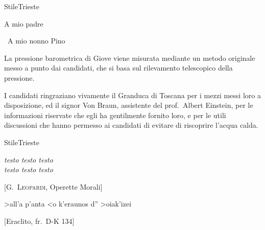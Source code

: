 \documentclass[11pt,twoside,oldstyle,autoretitolo,classica,greek,evenboxes]{toptesi}
\begin{document}

\english%


\expandafter\ifx\csname StileTrieste\endcsname\relax
    \frontespizio
\else
    \paginavuota
    \begin{dedica}
        A mio padre

        \textdagger\ A mio nonno Pino
    \end{dedica}
    \tomo
\fi


\sommario

 La pressione barometrica di Giove viene misurata
mediante un metodo originale  messo a punto dai candidati, che si basa
sul rilevamento telescopico della pressione.

\ringraziamenti

I candidati ringraziano vivamente il Granduca di Toscana per i mezzi
messi loro a disposizione, ed il signor Von Braun, assistente del
prof.~Albert Einstein, per le informazioni riservate che egli ha
gentilmente fornito loro, e per le utili discussioni che hanno permesso
ai candidati di evitare di riscoprire l'acqua calda.

\tablespagetrue\figurespagetrue %
\indici

\expandafter\ifx\csname StileTrieste\endcsname\relax
\else
    \begin{citazioni}
        \textit{testo testo testo\\testo testo testo}

        [\textsc{G.\ Leopardi}, Operette Morali]

        \textgreek{>all'a p'anta <o k'eraunos d'' >oiak'izei}

        [Eraclito, fr.\ D-K 134]
    \end{citazioni}
\end{document}
